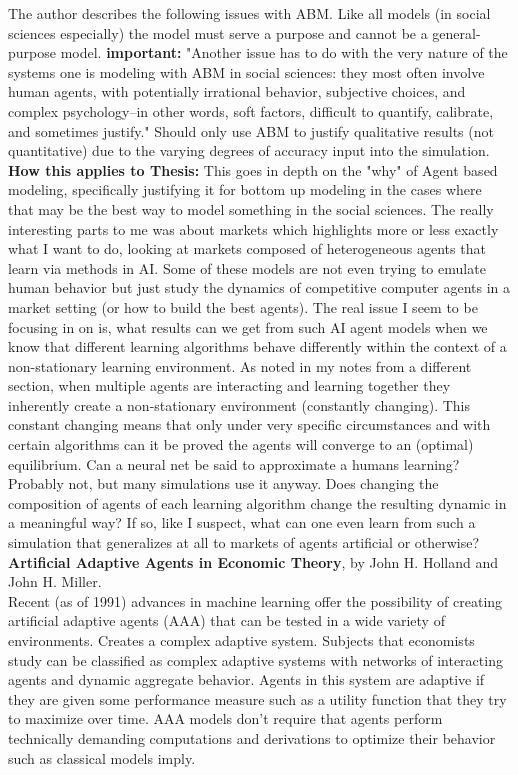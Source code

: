\documentclass[12pt,twoside]{reedthesis}
\begin{document}
The author describes the following issues with ABM. Like all models (in social sciences especially) the model must serve a purpose and cannot be a general-purpose model. \textbf{important:} 
"Another issue has to do with the very nature of the systems one is modeling with ABM in social sciences: they most often involve human agents, with potentially irrational behavior, subjective choices, and complex psychology--in other words, soft factors, difficult to quantify, calibrate, and sometimes justify." Should only use ABM to justify qualitative results (not quantitative) due to the varying degrees of accuracy input into the simulation. 
\cite{Bonabeau2002} \\

\textbf{How this applies to Thesis:} This goes in depth on the "why" of Agent based modeling, specifically justifying it for bottom up modeling in the cases where that may be the best way to model something in the social sciences. The really interesting parts to me was about markets which highlights more or less exactly what I want to do, looking at markets composed of heterogeneous agents that learn via methods in AI. Some of these models are not even trying to emulate human behavior but just study the dynamics of competitive computer agents in a market setting (or how to build the best agents). The real issue I seem to be focusing in on is, what results can we get from such AI agent models when we know that different learning algorithms behave differently within the context of a non-stationary learning environment. As noted in my notes from a different section, when multiple agents are interacting and learning together they inherently create a non-stationary environment (constantly changing). This constant changing means that only under very specific circumstances and with certain algorithms can it be proved the agents will converge to an (optimal) equilibrium. Can a neural net be said to approximate a humans learning? Probably not, but many simulations use it anyway. Does changing the composition of agents of each learning algorithm change the resulting dynamic in a meaningful way? If so, like I suspect, what can one even learn from such a simulation that generalizes at all to markets of agents artificial or otherwise?  \\  

\textbf{Artificial Adaptive Agents in Economic Theory}, by John H. Holland and John H. Miller.\\

Recent (as of 1991) advances in machine learning offer the possibility of creating artificial adaptive agents (AAA) that can be tested in a wide variety of environments. Creates a complex adaptive system. Subjects that economists study can be classified as complex adaptive systems with networks of interacting agents and dynamic aggregate behavior. Agents in this system are adaptive if they are given some performance measure such as a utility function that they try to maximize over time. AAA models don't require that agents perform technically demanding computations and derivations to optimize their behavior such as classical models imply. 
\end{document}
